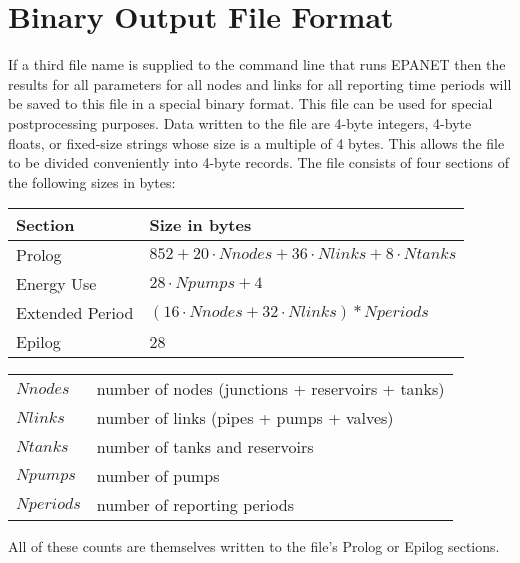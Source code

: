 \chapter{Binary Output File Format}
If a third file name is supplied to the command line that runs EPANET then the
results for all parameters for all nodes and links for all reporting time periods will be
saved to this file in a special binary format. This file can be used for special postprocessing
purposes. Data written to the file are 4-byte integers, 4-byte floats, or
fixed-size strings whose size is a multiple of 4 bytes. This allows the file to be
divided conveniently into 4-byte records. The file consists of four sections of the
following sizes in bytes:
\begin{tabular}{|l|l|}
\hline
Section &Size in bytes\\
\hline
Prolog& $852 + 20\cdot Nnodes + 36\cdot Nlinks + 8\cdot Ntanks$   \\
Energy Use& $28\cdot Npumps + 4 $   \\
Extended Period& $(16\cdot Nnodes + 32\cdot Nlinks)*Nperiods$ \\
Epilog& 28 \\
\hline
\end{tabular}

\begin{tabular}{l l }
$Nnodes$ & number of nodes (junctions + reservoirs + tanks) \\
$Nlinks$ & number of links (pipes + pumps + valves)\\
$Ntanks$ & number of tanks and reservoirs\\
$Npumps$ & number of pumps\\
$Nperiods$& number of reporting periods\\
\end{tabular}

All of these counts are themselves written to the file's Prolog or Epilog sections.

